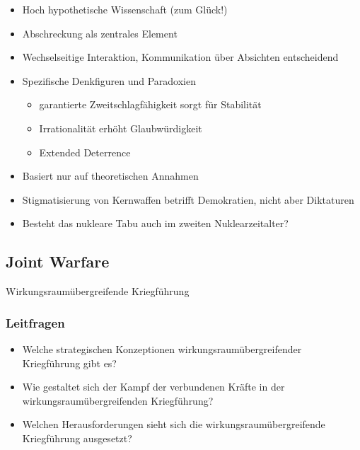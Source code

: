 {}\documentclass[a4paper]{article}
\providecommand{\tightlist}{\setlength{\itemsep}{1mm}\setlength{\parskip}{1mm}}
\begin{document}
\begin{itemize}
	\tightlist
	\item
	      Hoch hypothetische Wissenschaft (zum Glück!)
	\item
	      Abschreckung als zentrales Element
	\item
	      Wechselseitige Interaktion, Kommunikation über Absichten entscheidend
	\item
	      Spezifische Denkfiguren und Paradoxien

	      \begin{itemize}
		      \tightlist
		      \item
		            garantierte Zweitschlagfähigkeit sorgt für Stabilität
		      \item
		            Irrationalität erhöht Glaubwürdigkeit
		      \item
		            Extended Deterrence
	      \end{itemize}
	\item
	      Basiert nur auf theoretischen Annahmen
	\item
	      Stigmatisierung von Kernwaffen betrifft Demokratien, nicht aber
	      Diktaturen
	\item
	      Besteht das nukleare Tabu auch im zweiten Nuklearzeitalter?
\end{itemize}

\subsection{Joint Warfare}\label{joint-warfare}

Wirkungsraumübergreifende Kriegführung

\subsubsection{Leitfragen}\label{leitfragen}

\begin{itemize}
	\tightlist
	\item
	      Welche strategischen Konzeptionen wirkungsraumübergreifender
	      Kriegführung gibt es?
	\item
	      Wie gestaltet sich der Kampf der verbundenen Kräfte in der
	      wirkungsraumübergreifenden Kriegführung?
	\item
	      Welchen Herausforderungen sieht sich die wirkungsraumübergreifende
	      Kriegführung ausgesetzt?
\end{itemize}
\end{document}
